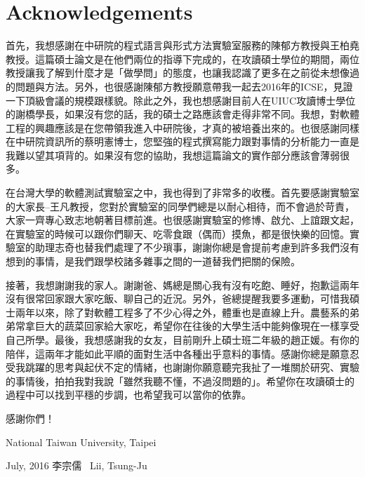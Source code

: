\chapter{Acknowledgements}

首先，我想感謝在中研院的程式語言與形式方法實驗室服務的陳郁方教授與王柏堯教授。這篇碩士論文是在他們兩位的指導下完成的，在攻讀碩士學位的期間，兩位教授讓我了解到什麼才是「做學問」的態度，也讓我認識了更多在之前從未想像過的問題與方法。另外，也很感謝陳郁方教授願意帶我一起去2016年的ICSE，見證一下頂級會議的規模跟樣貌。除此之外，我也想感謝目前人在UIUC攻讀博士學位的謝橋學長，如果沒有您的話，我的碩士之路應該會走得非常不同。我想，對軟體工程的興趣應該是在您帶領我進入中研院後，才真的被培養出來的。也很感謝同樣在中研院資訊所的蔡明憲博士，您堅強的程式撰寫能力跟對事情的分析能力一直是我難以望其項背的。如果沒有您的協助，我想這篇論文的實作部分應該會薄弱很多。

在台灣大學的軟體測試實驗室之中，我也得到了非常多的收穫。首先要感謝實驗室的大家長--王凡教授，您對於實驗室的同學們總是以耐心相待，而不會過於苛責，大家一齊專心致志地朝著目標前進。也很感謝實驗室的修博、啟允、上誼跟文起，在實驗室的時候可以跟你們聊天、吃零食跟（偶而）摸魚，都是很快樂的回憶。實驗室的助理志奇也替我們處理了不少瑣事，謝謝你總是會提前考慮到許多我們沒有想到的事情，是我們跟學校諸多雜事之間的一道替我們把關的保險。

接著，我想謝謝我的家人。謝謝爸、媽總是關心我有沒有吃飽、睡好，抱歉這兩年沒有很常回家跟大家吃飯、聊自己的近況。另外，爸總提醒我要多運動，可惜我碩士兩年以來，除了對軟體工程多了不少心得之外，體重也是直線上升。農藝系的弟弟常拿巨大的蔬菜回家給大家吃，希望你在往後的大學生活中能夠像現在一樣享受自己所學。最後，我想感謝我的女友，目前剛升上碩士班二年級的趙正媛。有你的陪伴，這兩年才能如此平順的面對生活中各種出乎意料的事情。感謝你總是願意忍受我跳躍的思考與起伏不定的情緒，也謝謝你願意聽完我扯了一堆關於研究、實驗的事情後，拍拍我對我說「雖然我聽不懂，不過沒問題的」。希望你在攻讀碩士的過程中可以找到平穩的步調，也希望我可以當你的依靠。

\vspace{8mm}
\noindent
感謝你們！

\vspace{8mm}

\noindent
National Taiwan University, Taipei

\noindent
July, 2016 \hfill 李宗儒 \ Lii, Tsung-Ju

